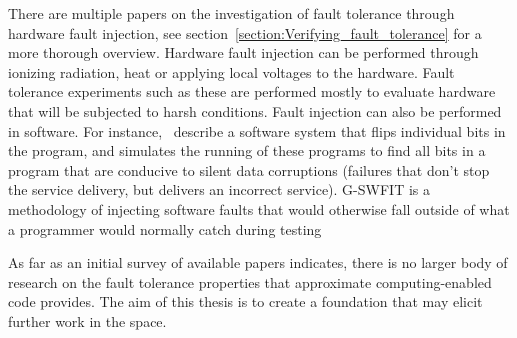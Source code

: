 There are multiple papers on the investigation of fault tolerance through hardware fault injection, see section~\ref{section:Verifying_fault_tolerance} for a more thorough overview. Hardware fault injection can be performed through ionizing radiation, heat or applying local voltages to the hardware. Fault tolerance experiments such as these are performed mostly to evaluate hardware that will be subjected to harsh conditions. 
Fault injection can also be performed in software. For instance,~\citet{venkatagiri2019gem5} describe a software system that flips individual bits in the program, and simulates the running of these programs to find all bits in a program that are conducive to silent data corruptions (failures that don't stop the service delivery, but delivers an incorrect service).  G-SWFIT is a methodology of injecting software faults that would otherwise fall outside of what a programmer would normally catch during testing~\citep{natella2012fault}


As far as an initial survey of available papers indicates, there is no larger body of research on the fault tolerance properties that approximate computing-enabled code provides. The aim of this thesis is to create a foundation that may elicit further work in the space.